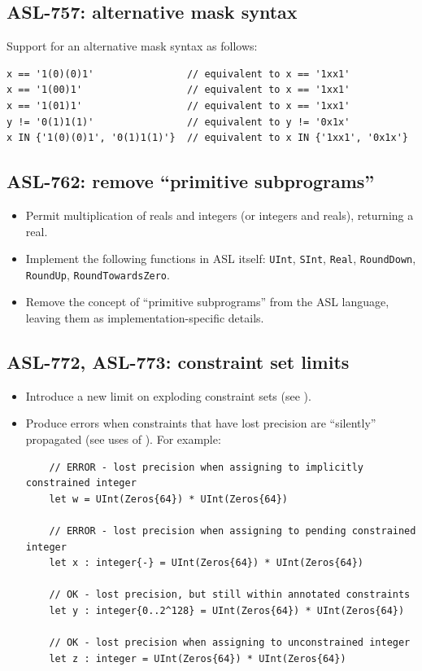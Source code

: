 \subsection{ASL-757: alternative mask syntax}
Support for an alternative mask syntax as follows:
\begin{lstlisting}
x == '1(0)(0)1'                // equivalent to x == '1xx1'
x == '1(00)1'                  // equivalent to x == '1xx1'
x == '1(01)1'                  // equivalent to x == '1xx1'
y != '0(1)1(1)'                // equivalent to y != '0x1x'
x IN {'1(0)(0)1', '0(1)1(1)'}  // equivalent to x IN {'1xx1', '0x1x'}
\end{lstlisting}

\subsection{ASL-762: remove ``primitive subprograms''}
\begin{itemize}
  \item Permit multiplication of reals and integers (or integers and reals), returning a real.
  \item Implement the following functions in ASL itself: \texttt{UInt}, \texttt{SInt}, \texttt{Real}, \texttt{RoundDown}, \texttt{RoundUp}, \texttt{RoundTowardsZero}.
  \item Remove the concept of ``primitive subprograms'' from the ASL language, leaving them as implementation-specific details.
\end{itemize}

\subsection{ASL-772, ASL-773: constraint set limits}
\begin{itemize}
  \item Introduce a new limit on exploding constraint sets (see ).
  \item Produce errors when constraints that have lost precision are ``silently'' propagated (see uses of ). For example:
  \begin{lstlisting}
    // ERROR - lost precision when assigning to implicitly constrained integer
    let w = UInt(Zeros{64}) * UInt(Zeros{64})

    // ERROR - lost precision when assigning to pending constrained integer
    let x : integer{-} = UInt(Zeros{64}) * UInt(Zeros{64})

    // OK - lost precision, but still within annotated constraints
    let y : integer{0..2^128} = UInt(Zeros{64}) * UInt(Zeros{64})

    // OK - lost precision when assigning to unconstrained integer
    let z : integer = UInt(Zeros{64}) * UInt(Zeros{64})
  \end{lstlisting}
\end{itemize}

